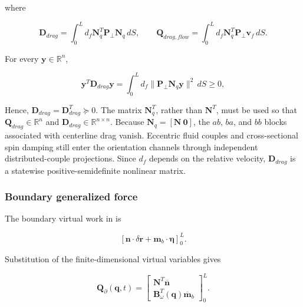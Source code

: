 where

\begin{equation}
\label{eq:galerkin-2-75}
\boxed{\mathbf{D}_{drag} = \int_{0}^{L}d_{f}\mathbf{N}_{q}^{T}\mathbf{P}_{\bot}\mathbf{N}_{q}\, dS,\quad\quad\mathbf{Q}_{drag,flow} = \int_{0}^{L}d_{f}\mathbf{N}_{q}^{T}\mathbf{P}_{\bot}\mathbf{v}_{f}\, dS.}
\end{equation}

For every \(\mathbf{y} \in \mathbb{R}^{n}\),

\begin{equation}
\label{eq:galerkin-2-76}
\mathbf{y}^{T}\mathbf{D}_{drag}\mathbf{y} = \int_{0}^{L}d_{f} \parallel \mathbf{P}_{\bot}\mathbf{N}_{q}\mathbf{y} \parallel^{2}\, dS \geq 0,
\end{equation}

Hence, \(\mathbf{D}_{drag} = \mathbf{D}_{drag}^{T} \succcurlyeq 0\). The matrix \(\mathbf{N}_{q}^{T}\), rather than \(\mathbf{N}^{T}\), must be used so that \(\mathbf{Q}_{drag} \in \mathbb{R}^{n}\) and \(\mathbf{D}_{drag} \in \mathbb{R}^{n \times n}\). Because \(\mathbf{N}_{q} = \left\lbrack \mathbf{N}\ \mathbf{0} \right\rbrack\), the \(ab\), \(ba\), and \(bb\) blocks associated with centerline drag vanish. Eccentric fluid couples and cross-sectional spin damping still enter the orientation channels through independent distributed-couple projections. Since \(d_{f}\) depends on the relative velocity, \(\mathbf{D}_{drag}\) is a statewise positive-semidefinite nonlinear matrix.

\subsubsection{Boundary generalized force}\label{sec:galerkin-2-5-4}

The boundary virtual work in  is

\begin{equation}
\label{eq:galerkin-2-77}
\left\lbrack \mathbf{n} \cdot \delta\mathbf{r} + \mathbf{m}_{b} \cdot \bm{\eta} \right\rbrack_{0}^{L}.
\end{equation}

Substitution of the finite-dimensional virtual variables gives

\begin{equation}
\label{eq:galerkin-2-78}
\boxed{\mathbf{Q}_{\partial}\left( \mathbf{q},t \right) = \begin{bmatrix}
\mathbf{N}^{T}\overline{\mathbf{n}} \\
\mathbf{B}_{\omega}^{T}\left( \mathbf{q} \right){\overline{\mathbf{m}}}_{b}
\end{bmatrix}_{0}^{L}.}
\end{equation}

